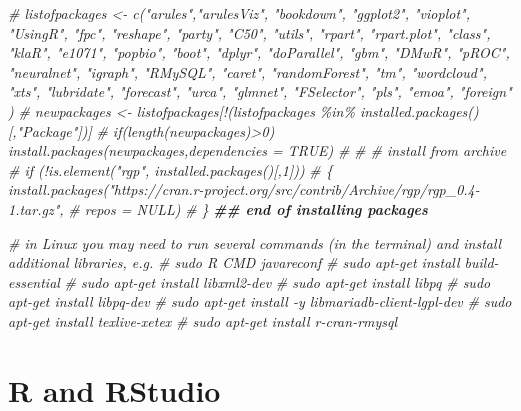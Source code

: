 \documentclass[
]{book}
\newenvironment{Shaded}{\begin{snugshade}}{\end{snugshade}}
\newcommand{\CommentTok}[1]{\textcolor[rgb]{0.56,0.35,0.01}{\textit{#1}}}
\newcommand{\DocumentationTok}[1]{\textcolor[rgb]{0.56,0.35,0.01}{\textbf{\textit{#1}}}}
\begin{document}
\begin{Shaded}
\begin{Highlighting}[]
\CommentTok{\# listofpackages \textless{}{-} c("arules","arulesViz", "bookdown", "ggplot2", "vioplot", "UsingR", "fpc", "reshape",  "party", "C50", "utils", "rpart", "rpart.plot", "class", "klaR", "e1071", "popbio", "boot", "dplyr", "doParallel", "gbm", "DMwR", "pROC", "neuralnet", "igraph", "RMySQL", "caret", "randomForest", "tm", "wordcloud", "xts", "lubridate", "forecast", "urca", "glmnet", "FSelector", "pls", "emoa", "foreign" )}
\CommentTok{\# newpackages \textless{}{-} listofpackages[!(listofpackages \%in\% installed.packages()[,"Package"])]}
\CommentTok{\# if(length(newpackages)\textgreater{}0) install.packages(newpackages,dependencies = TRUE)}
\CommentTok{\# }
\CommentTok{\# \# install from archive}
\CommentTok{\# if (!is.element("rgp", installed.packages()[,1]))}
\CommentTok{\# \{ install.packages("https://cran.r{-}project.org/src/contrib/Archive/rgp/rgp\_0.4{-}1.tar.gz", }
\CommentTok{\#                                                     repos = NULL)}
\CommentTok{\# \}}
\DocumentationTok{\#\# end of installing packages}

\CommentTok{\# in Linux you may need to run several commands (in the terminal) and install additional libraries, e.g. }
\CommentTok{\# sudo R CMD javareconf}
\CommentTok{\# sudo apt{-}get install build{-}essential}
\CommentTok{\# sudo apt{-}get install libxml2{-}dev}
\CommentTok{\# sudo apt{-}get install libpq}
\CommentTok{\# sudo apt{-}get install libpq{-}dev}
\CommentTok{\# sudo apt{-}get install {-}y libmariadb{-}client{-}lgpl{-}dev}
\CommentTok{\# sudo apt{-}get install texlive{-}xetex}
\CommentTok{\# sudo apt{-}get install r{-}cran{-}rmysql}
\end{Highlighting}
\end{Shaded}

\hypertarget{r-and-rstudio}{%
\section{R and RStudio}\label{r-and-rstudio}}
\end{document}
